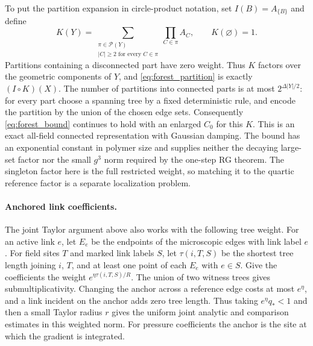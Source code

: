 \documentclass[11pt]{article}
\begin{document}
To put the partition expansion in circle-product notation, set
\(I(B)=A_{\{B\}}\) and define
\[
 K(Y)=\sum_{\substack{\pi\in\mathcal P(Y)\\|C|\ge2\text{ for every }C\in\pi}}
                \prod_{C\in\pi}A_C,
 \qquad K(\varnothing)=1.
\]
Partitions containing a disconnected part have zero weight.
Thus \(K\) factors over the geometric components of \(Y\),
and \eqref{eq:forest_partition} is exactly \((I\circ K)(X)\).
The number of partitions into connected parts is at most
\(2^{\Delta |Y|/2}\): for every part choose a spanning tree by
a fixed deterministic rule, and encode the partition by the
union of the chosen edge sets. Consequently \eqref{eq:forest_bound}
continues to hold with an enlarged \(C_0\) for this \(K\).
This is an exact all-field connected representation with
Gaussian damping. The bound has an exponential constant in
polymer size and supplies neither the decaying large-set factor
nor the small \(g^3\) norm required by the one-step RG theorem.
The singleton factor here is the full restricted weight, so
matching it to the quartic reference factor is a separate
localization problem.

\paragraph{Anchored link coefficients.}
The joint Taylor argument above also works with the following tree
weight. For an active link \(e\), let \(E_e\) be the endpoints of
the microscopic edges with link label \(e\). For field sites \(T\)
and marked link labels \(S\), let \(\tau(i,T,S)\) be the shortest
tree length joining \(i\), \(T\), and at least one point of each
\(E_e\) with \(e\in S\). Give the coefficients the weight
\(e^{\eta\tau(i,T,S)/R}\). The union of two witness trees gives
submultiplicativity. Changing the anchor across a reference edge
costs at most \(e^\eta\), and a link incident on the anchor adds
zero tree length. Thus taking \(e^\eta q_*<1\) and then a small
Taylor radius \(r\) gives the uniform joint analytic and comparison
estimates in this weighted norm. For pressure coefficients the
anchor is the site at which the gradient is integrated.
\end{document}
